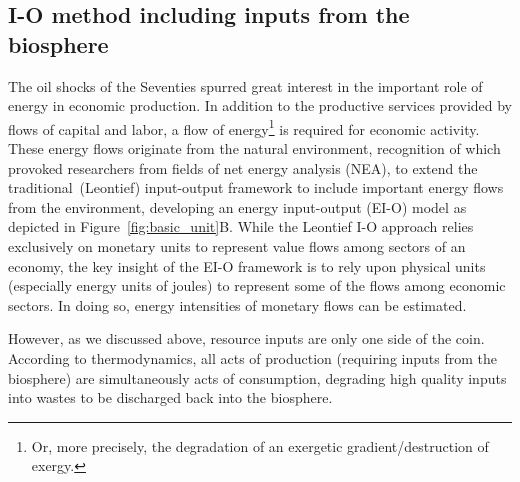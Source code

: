 \subsection{I-O method including inputs from the biosphere}
\label{sec:IO_resource}

The oil shocks of the Seventies spurred great interest in
the important role of energy in economic production.
In addition to the productive services 
provided by flows of capital and labor,
a flow of energy\footnote{Or, more precisely, 
the degradation of an exergetic gradient/destruction of exergy.} 
is required for economic activity. 
These energy flows originate from the natural environment, 
recognition of which provoked researchers from fields of 
net energy analysis (NEA), 
to extend the traditional~(Leontief) 
input-output framework 
to include important 
energy flows from the environment, 
developing an energy input-output 
(EI-O) model
as depicted in Figure~\ref{fig:basic_unit}B.\cite{Carter1974,
Bullard1975,Bullard1976a,Herendeen1978,Costanza:1980ww,
Casler1984,Joshi:1999uw,Suh2009}
While the Leontief I-O approach relies exclusively 
on monetary units to represent value flows 
among sectors of an economy, 
the key insight of the EI-O framework 
is to rely upon physical units 
(especially energy units of joules) 
to represent some of the flows among economic sectors. 
In doing so, 
energy intensities of monetary flows can be estimated. 

However,
as we discussed above,
resource inputs are only one side of the coin.
According to thermodynamics,
all acts of production (requiring inputs from the biosphere)
are simultaneously acts of consumption,
degrading high quality inputs into wastes to be 
discharged back into the biosphere.


